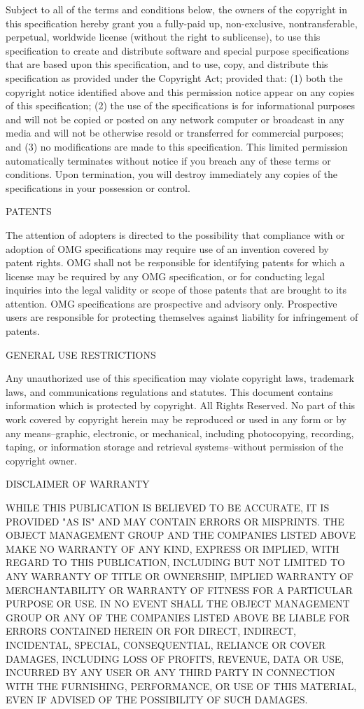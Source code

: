 \documentclass[10pt, a4paper]{isov2}
\newcommand{\OMGparagraph}[1]{
\vspace{23pt}
{\centerline {#1}}
\vspace{3pt}
}
\begin{document}
Subject to all of the terms and conditions below, the owners of the copyright in this specification 
hereby grant you a fully-paid up, non-exclusive, nontransferable, perpetual, worldwide license 
 (without the right to sublicense), to use this specification to create and distribute software and 
  special purpose specifications that are based upon this specification, and to use, copy, and 
distribute this specification as provided under the Copyright Act; provided that: (1) both the 
 copyright notice identified above and this permission notice appear on any copies of this 
  specification; (2) the use of the specifications is for informational purposes and will not be 
copied or posted on any network computer or broadcast in any media and will not be otherwise resold 
 or transferred for commercial purposes; and (3) no modifications are made to this specification. 
This limited permission automatically terminates without notice if you breach any of these terms or 
 conditions. Upon termination, you will destroy immediately any copies of the specifications in 
  your possession or control.



\OMGparagraph{PATENTS}
The attention of adopters is directed to the possibility that compliance with or adoption of OMG 
 specifications may require use of an invention covered by patent rights. OMG shall not be 
  responsible for identifying patents for which a license may be required by any OMG specification, 
   or for conducting legal inquiries into the legal validity or scope of those patents that are 
    brought to its attention. OMG specifications are prospective and advisory only. Prospective 
	 users are responsible for protecting themselves against liability for infringement of patents.

\OMGparagraph{GENERAL USE RESTRICTIONS}
Any unauthorized use of this specification may violate copyright laws, trademark laws, and 
 communications regulations and statutes. This document contains information which is protected by 
  copyright. All Rights Reserved. No part of this work covered by copyright herein may be 
   reproduced or used in any form or by any means--graphic, electronic, or mechanical, including 
    photocopying, recording, taping, or information storage and retrieval systems--without 
	 permission of the copyright owner.

\newpage
\OMGparagraph{DISCLAIMER OF WARRANTY}
WHILE THIS PUBLICATION IS BELIEVED TO BE ACCURATE, IT IS PROVIDED "AS IS" AND MAY CONTAIN ERRORS OR MISPRINTS. THE OBJECT MANAGEMENT GROUP AND THE COMPANIES LISTED ABOVE MAKE NO WARRANTY OF ANY KIND, EXPRESS OR IMPLIED, WITH REGARD TO THIS PUBLICATION, INCLUDING BUT NOT LIMITED TO ANY WARRANTY OF TITLE OR OWNERSHIP, IMPLIED WARRANTY OF MERCHANTABILITY OR WARRANTY OF FITNESS FOR A PARTICULAR PURPOSE OR USE. IN NO EVENT SHALL THE OBJECT MANAGEMENT GROUP OR ANY OF THE COMPANIES LISTED ABOVE BE LIABLE FOR ERRORS CONTAINED HEREIN OR FOR DIRECT, INDIRECT, INCIDENTAL, SPECIAL, CONSEQUENTIAL, RELIANCE OR COVER DAMAGES, INCLUDING LOSS OF PROFITS, REVENUE, DATA OR USE, INCURRED BY ANY USER OR ANY THIRD PARTY IN CONNECTION WITH THE FURNISHING, PERFORMANCE, OR USE OF THIS MATERIAL, EVEN IF ADVISED OF THE POSSIBILITY OF SUCH DAMAGES.
\end{document}
